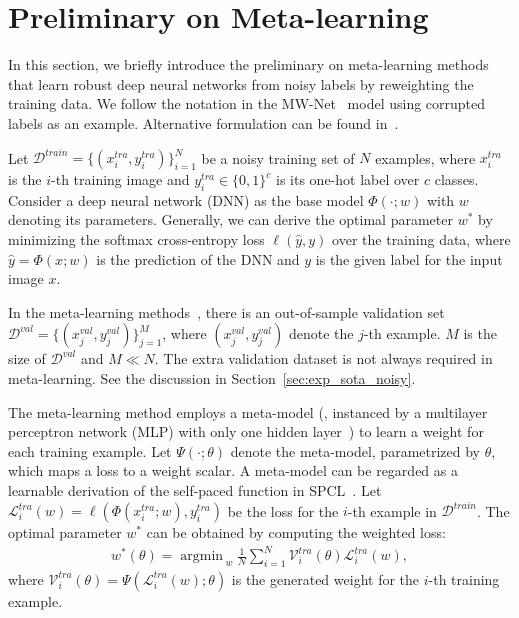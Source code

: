 \documentclass[final]{cvpr}
\newcommand{\argmin}{\mathop{\mathrm{argmin\,}}}
\begin{document}
\section{Preliminary on Meta-learning}\label{sec:preliminary}

In this section, we briefly introduce the preliminary on meta-learning methods~\cite{ren2018learning, shu2019meta} that learn robust deep neural networks from noisy labels by reweighting the training data.
We follow the notation in the MW-Net~\cite{shu2019meta} model using corrupted labels as an example. Alternative formulation can be found in~\cite{ren2018learning,wang2020training,vyas2020learning}.

Let $\mathcal{D}^{train}=\{(x_i^{tra}, y_i^{tra})\}_{i=1}^N$ be a noisy training set of $N$ examples, 
where $x_i^{tra}$ is the $i$-th training image and $y_i^{tra}\in \{0, 1\}^{c}$ is its one-hot label over $c$ classes.
Consider a deep neural network (DNN) as the base model $\Phi(\cdot; w)$ with $w$ denoting its parameters.
Generally, we can derive the optimal parameter $w^{*}$ by minimizing the softmax cross-entropy loss $\ell(\hat{y}, y)$ over the training data, where $\hat{y} = \Phi(x; w)$ is the prediction of the DNN and $y$ is the given label for the input image $x$.


In the meta-learning methods~\cite{ren2018learning, shu2019meta}, there is an out-of-sample validation set $\mathcal{D}^{val}=\{(x_j^{val}, y_j^{val})\}_{j=1}^M$, where $(x_j^{val}, y_j^{val})$ denote the $j$-th example. $M$ is the size of $\mathcal{D}^{val}$ and $M \ll N$. The extra validation dataset is not always required in meta-learning. See the discussion in Section~\ref{sec:exp_sota_noisy}. 

The meta-learning method employs a meta-model (\eg, instanced by a multilayer perceptron network (MLP) with only one hidden layer~\cite{shu2019meta}) to learn a weight for each training example. Let $\Psi(\cdot; \theta)$ denote the meta-model, parametrized by $\theta$, which maps a loss to a weight scalar. A meta-model can be regarded as a learnable derivation of the self-paced function in SPCL~\cite{jiang2015self}.
Let $\mathcal{L}_i^{tra}(w) = \ell(\Phi(x_i^{tra}; w), y_i^{tra})$ be the loss for the $i$-th example in $\mathcal{D}^{train}$. The optimal parameter $w^*$ can be obtained by computing the weighted loss: 
\begin{equation}\label{eq:obj_classifer}
    \begin{split}
        w^{*}(\theta) = \argmin_{w} 
        \frac{1}{N}\sum_{i=1}^{N}\mathcal{V}_i^{tra}(\theta)\mathcal{L}_i^{tra}(w),
    \end{split}
\end{equation}
where $\mathcal{V}_i^{tra}(\theta)=\Psi(\mathcal{L}_i^{tra}(w); \theta)$ is the generated weight for the $i$-th training example.
\end{document}

